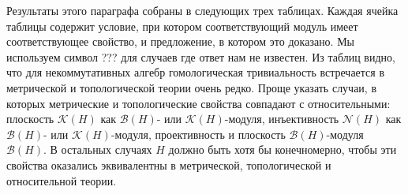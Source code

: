 Результаты этого параграфа собраны в следующих трех таблицах. Каждая ячейка таблицы содержит условие, при котором соответствующий модуль имеет соответствующее свойство, и предложение, в котором это доказано. Мы используем символ ??? для случаев где ответ нам не известен. Из таблиц видно, что для некоммутативных алгебр гомологическая тривиальность встречается в метрической и топологической теории очень редко. Проще указать случаи, в которых метрические и топологические свойства совпадают с относительными: плоскость $\mathcal{K}(H)$ как $\mathcal{B}(H)$- или $\mathcal{K}(H)$-модуля, инъективность $\mathcal{N}(H)$ как $\mathcal{B}(H)$- или $\mathcal{K}(H)$-модуля, проективность и плоскость $\mathcal{B}(H)$-модуля $\mathcal{B}(H)$. В остальных случаях $H$ должно быть хотя бы конечномерно, чтобы эти свойства оказались эквивалентны в метрической, топологической и относительной теории.

